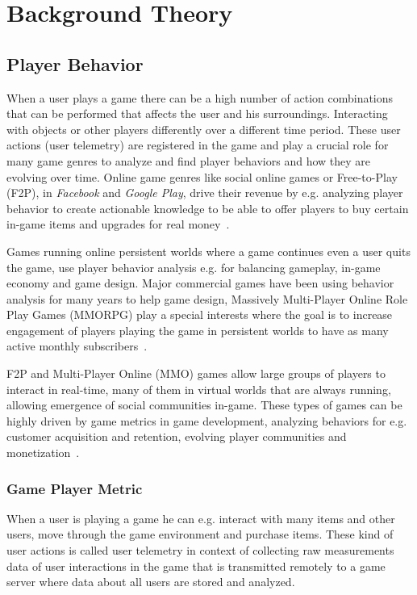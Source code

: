 
\chapter{Background Theory} %
\label{Chapter2}


\section{Player Behavior}
When a user plays a game there can be a high number of action combinations that can be performed that affects the user and his surroundings. Interacting with objects or other players differently over a different time period. These user actions (user telemetry) are registered in the game and play a crucial role for many game genres to analyze and find player behaviors and how they are evolving over time. Online game genres like social online games or Free-to-Play (F2P), in \textit{Facebook} and \textit{Google Play}, drive their revenue by e.g. analyzing player behavior to create actionable knowledge to be able to offer players to buy certain in-game items and upgrades for real money~\citep{Kim:2008Tracking, Drachen:2011Evaluating, Fields:2011SocialGame, Seif:2013GameAnalytics}.

Games running online persistent worlds where a game continues even a user quits the game, use player behavior analysis e.g. for balancing gameplay, in-game economy and game design. Major commercial games have been using behavior analysis for many years to help game design, Massively Multi-Player Online Role Play Games (MMORPG) play a special interests where the goal is to increase engagement of players playing the game in persistent worlds to have as many active monthly subscribers~\citep{Zoeller:2010, Yannakakis:2012}. 

F2P and Multi-Player Online (MMO) games allow large groups of players to interact in real-time, many of them in virtual worlds that are always running, allowing emergence of social communities in-game. These types of games can be highly driven by game metrics in game development, analyzing behaviors for e.g. customer acquisition and retention, evolving player communities and monetization~\citep{Drachen:2013GDM}.

\subsection{Game Player Metric}
When a user is playing a game he can e.g. interact with many items and other users, move through the game environment and purchase items. These kind of user actions is called user telemetry in context of collecting raw measurements data of user interactions in the game that is transmitted remotely to a game server where data about all users are stored and analyzed. 

